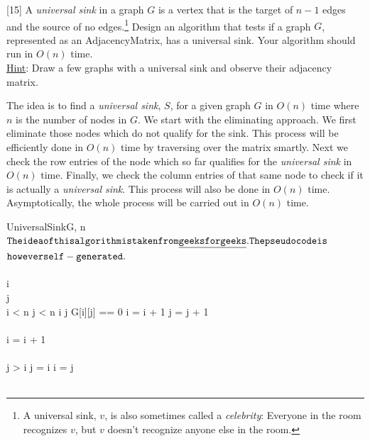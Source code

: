\documentclass[addpoints]{exam}
\begin{document}
\begin{questions}
  [15]
  A {\it universal sink} in a graph $G$ is a vertex that is the target of $n-1$ edges and the source of no edges.\footnote{A universal sink, $v$, is also sometimes called a {\it celebrity}: Everyone in the room recognizes $v$, but $v$ doesn't recognize anyone else in the room.} Design an algorithm that tests if a graph $G$, represented as an AdjacencyMatrix, has a universal sink. Your algorithm should run in $O(n)$ time.\\
  \underline{Hint}: Draw a few graphs with a universal sink and observe their adjacency matrix.
  \begin{solution}
  	The idea is to find a {\it universal sink}, $S$, for a given graph $G$ in $O(n)$ time where $n$ is the number of nodes in $G$. We start with the eliminating approach. We first eliminate those nodes which do not qualify for the sink. This process will be efficiently done in $O(n)$ time by traversing over the matrix smartly. Next we check the row entries of the node which so far qualifies for the {\it universal sink} in $O(n)$ time. Finally, we check the column entries of that same node to check if it is actually a {\it universal sink}. This process will also be done in $O(n)$ time. Asymptotically, the whole process will be carried out in $O(n)$ time. 
  	
  	\begin{pseudocode}{UniversalSink}{G, n}
  		\label{Universal Sink}
  		\\
  		
  		${\tt The idea of this algorithm is taken from \underline{geeksforgeeks}. The pseudocode is}$\\ ${\tt however self-generated.}$\\ \\
  		
  		i  \\
  		j  \\
  		\WHILE i < n \AND j < n\DO 
  		\BEGIN
  		\IF i \neq j
  		\THEN 
  			\BEGIN
  			\IF G[i][j] == 0 
	  		\THEN i = i + 1
	  		\ELSE j = j + 1\\
	  		\END \\
	  	\ELSE i = i + 1
	  	\END \\ \\
	  	
	  	\IF j > i
	  	\THEN j = i
	  	\ELSE i = j\\ \\
	  	

\end{pseudocode}
\end{solution}
\end{questions}
\end{document}
